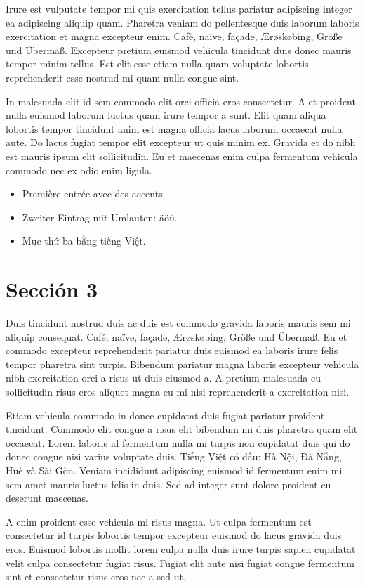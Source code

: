 \documentclass[11pt,a4paper]{article}
\begin{document}
Irure est vulputate tempor mi quis exercitation tellus pariatur
adipiscing integer ea adipiscing aliquip quam. Pharetra veniam do
pellentesque duis laborum laboris exercitation et magna excepteur enim.
Café, naïve, façade, Ærøskøbing, Größe und Übermaß. Excepteur pretium
euismod vehicula tincidunt duis donec mauris tempor minim tellus. Est
elit esse etiam nulla quam voluptate lobortis reprehenderit esse nostrud
mi quam nulla congue sint.

In malesuada elit id sem commodo elit orci officia eros consectetur. A
et proident nulla euismod laborum luctus quam irure tempor a sunt. Elit
quam aliqua lobortis tempor tincidunt anim est magna officia lacus
laborum occaecat nulla aute. Do lacus fugiat tempor elit excepteur ut
quis minim ex. Gravida et do nibh est mauris ipsum elit sollicitudin. Eu
et maecenas enim culpa fermentum vehicula commodo nec ex odio enim
ligula.

\begin{itemize}
  \item Première entrée avec des accents.
  \item Zweiter Eintrag mit Umlauten: äöü.
  \item Mục thứ ba bằng tiếng Việt.
\end{itemize}

\section{Sección 3}
Duis tincidunt nostrud duis ac duis est commodo gravida laboris mauris
sem mi aliquip consequat. Café, naïve, façade, Ærøskøbing, Größe und
Übermaß. Eu et commodo excepteur reprehenderit pariatur duis euismod ea
laboris irure felis tempor pharetra sint turpis. Bibendum pariatur magna
laboris excepteur vehicula nibh exercitation orci a risus ut duis
eiusmod a. A pretium malesuada eu sollicitudin risus eros aliquet magna
eu mi nisi reprehenderit a exercitation nisi.

Etiam vehicula commodo in donec cupidatat duis fugiat pariatur proident
tincidunt. Commodo elit congue a risus elit bibendum mi duis pharetra
quam elit occaecat. Lorem laboris id fermentum nulla mi turpis non
cupidatat duis qui do donec congue nisi varius voluptate duis. Tiếng
Việt có dấu: Hà Nội, Đà Nẵng, Huế và Sài Gòn. Veniam incididunt
adipiscing euismod id fermentum enim mi sem amet mauris luctus felis in
duis. Sed ad integer sunt dolore proident eu deserunt maecenas.

A enim proident esse vehicula mi risus magna. Ut culpa fermentum est
consectetur id turpis lobortis tempor excepteur euismod do lacus gravida
duis eros. Euismod lobortis mollit lorem culpa nulla duis irure turpis
sapien cupidatat velit culpa consectetur fugiat risus. Fugiat elit aute
nisi fugiat congue fermentum sint et consectetur risus eros nec a sed
ut.
\end{document}
